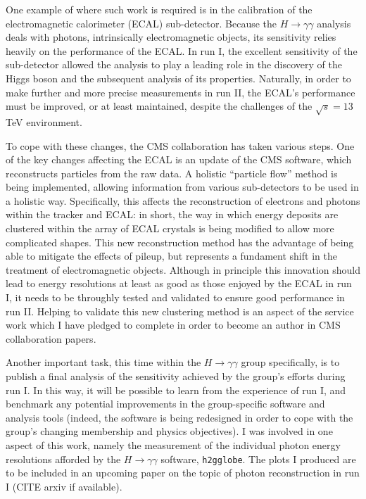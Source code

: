 \documentclass[10pt]{article}
\begin{document}
One example of where such work is required is in the calibration of the electromagnetic calorimeter (ECAL) sub-detector. Because the $H \rightarrow \gamma \gamma$ analysis deals with photons, intrinsically electromagnetic objects, its sensitivity relies heavily on the performance of the ECAL. In run I, the excellent sensitivity of the sub-detector allowed the analysis to play a  leading role in the discovery of the Higgs boson and the subsequent analysis of its properties. Naturally, in order to make further and more precise measurements in run II, the ECAL's performance must be improved, or at least maintained, despite the challenges of the $\sqrt{s} = 13$TeV environment.

To cope with these changes, the CMS collaboration has taken various steps. One of the key changes affecting the ECAL is an update of the CMS software, which reconstructs particles from the raw data. A holistic ``particle flow'' method is being implemented, allowing information from various sub-detectors to be used in a holistic way. Specifically, this affects the reconstruction of electrons and photons within the tracker and ECAL: in short, the way in which energy deposits are clustered within the array of ECAL crystals is being modified to allow more complicated shapes. This new reconstruction method has the advantage of being able to mitigate the effects of pileup, but represents a fundament shift in the treatment of electromagnetic objects. Although in principle this innovation should lead to energy resolutions at least as good as those enjoyed by the ECAL in run I, it needs to be throughly tested and validated to ensure good performance in run II. Helping to validate this new clustering method is an aspect of the service work which I have pledged to complete in order to become an author in CMS collaboration papers.

Another important task, this time within the $H \rightarrow \gamma \gamma$ group specifically, is to publish a final analysis of the sensitivity achieved by the group's efforts during run I. In this way, it will be possible to learn from the experience of run I, and benchmark any potential improvements in the group-specific software and analysis tools (indeed, the software is being redesigned in order to cope with the group's changing membership and physics objectives). I was involved in one aspect of this work, namely the measurement of the individual photon energy resolutions afforded by the $H \rightarrow \gamma \gamma$ software, \texttt{h2gglobe}. The plots I produced are to be included in an upcoming paper on the topic of photon reconstruction in run I (CITE arxiv if available). 
\end{document}
